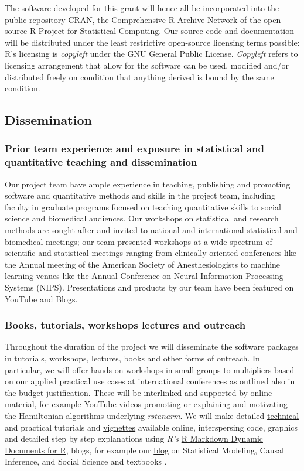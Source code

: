 \documentclass[11pt,notitlepage]{article}
\begin{document}
The software developed for this grant will hence all be incorporated into the public repository CRAN, the Comprehensive R Archive Network of the open-source R Project for Statistical Computing. Our source code and documentation will be distributed under the least restrictive open-source licensing terms possible: R's licensing is \textit{copyleft} under the GNU General Public License. \textit{Copyleft} refers to licensing arrangement that allow for the software can be used, modified and/or distributed freely on condition that anything derived is bound by the same condition. 

\subsection*{Dissemination}
\subsubsection*{Prior team experience and exposure in statistical and quantitative teaching and dissemination}
Our project team have ample experience in teaching, publishing and promoting software and quantitative methods and skills in the project team, including faculty in graduate programs focused on teaching quantitative skills to social science and biomedical audiences. Our workshops on statistical and research methods are sought after and invited to national and international statistical and biomedical meetings; our team presented workshops at a wide spectrum of scientific and statistical meetings ranging from clinically oriented conferences like the Annual meeting of the American Society of Anesthesiologists to machine learning venues like the Annual Conference on Neural Information Processing Systems (NIPS). Presentations  and products by our team have been featured on YouTube and Blogs.   

\subsubsection*{Books, tutorials, workshops lectures and outreach}
Throughout the duration of the project we will disseminate the software packages in tutorials, workshops, lectures, books and other forms of outreach. In particular, we will offer hands on workshops in small groups to multipliers based on our applied practical use cases at international conferences as outlined also in the budget justification. These will be interlinked and supported by online material, for example YouTube videos \href{https://www.youtube.com/watch?v=pWow8Qe1snQ}{promoting} or \href{https://www.youtube.com/watch?v=pHsuIaPbNbY}{explaining and motivating} the Hamiltonian algorithms underlying \textit{rstanarm}. We will make detailed \href{http://mc-stan.org/documentation/}{technical} and practical tutorials and \href{https://cran.r-project.org/web/packages/rstanarm/vignettes/aov.html}{vignettes} available online, interspersing code, graphics and detailed step by step explanations using \textit{R's}  \href{http://rmarkdown.rstudio.com/}{R Markdown \- Dynamic Documents for R}, blogs, for example our \href{http://andrewgelman.com/}{blog} on Statistical Modeling, Causal Inference, and Social Science and textbooks \cite{Gelman-Hill_2014}. 
\end{document}
